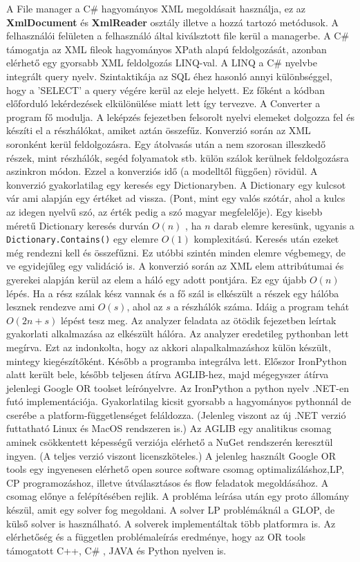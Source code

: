 A File manager a C\# hagyományos XML megoldásait használja, ez az \textbf{XmlDocument} és \textbf{XmlReader} osztály illetve a hozzá tartozó metódusok. A felhasználói felületen a felhasználó által kiválsztott file kerül a managerbe. A C\# támogatja az XML fileok hagyományos XPath alapú feldolgozását, azonban elérhető egy gyorsabb XML feldolgozás LINQ-val. A LINQ a C\# nyelvbe integrált query nyelv. Szintaktikája az SQL éhez hasonló annyi különbséggel, hogy a 'SELECT' a query végére kerül az eleje helyett. Ez főként a kódban előforduló lekérdezések elkülönülése miatt lett így tervezve. 
A Converter a program fő modulja. A leképzés fejezetben felsorolt nyelvi elemeket dolgozza fel és készíti el a részhálókat, amiket aztán összefűz. Konverzió során az XML soronként kerül feldolgozásra. Egy átolvasás után a nem szorosan illeszkedő részek, mint részhálók, segéd folyamatok stb. külön szálok kerülnek feldolgozásra aszinkron módon. Ezzel a konverziós idő (a modelltől függően) rövidül. A konverzió gyakorlatilag egy keresés egy Dictionaryben. A Dictionary egy kulcsot vár ami alapján egy értéket ad vissza. (Pont, mint egy valós szótár, ahol a kulcs az idegen nyelvű szó, az érték pedig a szó magyar megfelelője). Egy kisebb méretű Dictionary keresés durván $O(n)$ , ha $n$ darab elemre keresünk, ugyanis a \texttt{Dictionary.Contains()} egy elemre $O(1)$ komplexitású. Keresés után ezeket még rendezni kell és összefűzni. Ez utóbbi szintén minden elemre végbemegy, de ve egyidejűleg egy validáció is. A konverzió során az XML elem attribútumai és gyerekei alapján kerül az elem a háló egy adott pontjára. Ez egy újabb $O(n)$ lépés. Ha a rész szálak kész vannak és a fő szál is elkészült a részek egy hálóba lesznek rendezve ami $O(s)$, ahol az $s$ a részhálók száma. Idáig a program tehát $O(2n+s)$ lépést tesz meg. 
Az analyzer feladata az ötödik %
 fejezetben leírtak gyakorlati alkalmazása az elkészült hálóra. Az analyzer eredetileg pythonban lett megírva. Ezt az indonkolta, hogy az akkori alapalkalmazáshoz külön készült, mintegy kiegészítőként. Később a programba integrálva lett. Előszor IronPython alatt került bele, később teljesen átírva AGLIB-hez, majd mégegyszer átírva jelenlegi Google OR toolset leírónyelvre. Az IronPython a python nyelv .NET-en futó implementációja. Gyakorlatilag kicsit gyorsabb a hagyományos pythonnál de cserébe a platform-függetlenséget feláldozza. (Jelenleg viszont az új .NET verzió futtatható Linux és MacOS rendszeren is.) Az AGLIB egy analitikus csomag aminek csökkentett képességű verziója elérhető a NuGet rendszerén keresztül ingyen. (A teljes verzió viszont licenszköteles.) A jelenleg használt Google OR tools egy ingyenesen elérhető open source software csomag optimalizáláshoz,LP, CP programozáshoz, illetve útválasztásos és flow feladatok megoldásához. A csomag előnye a felépítésében rejlik. A probléma leírása után egy proto állomány  készül, amit egy solver fog megoldani. A solver LP problémáknál a GLOP, de külső solver is használható. A solverek implementáltak több platformra is. Az elérhetőség és a független problémaleírás eredménye, hogy az OR tools támogatott C++, C\# , JAVA és Python nyelven is.
 
